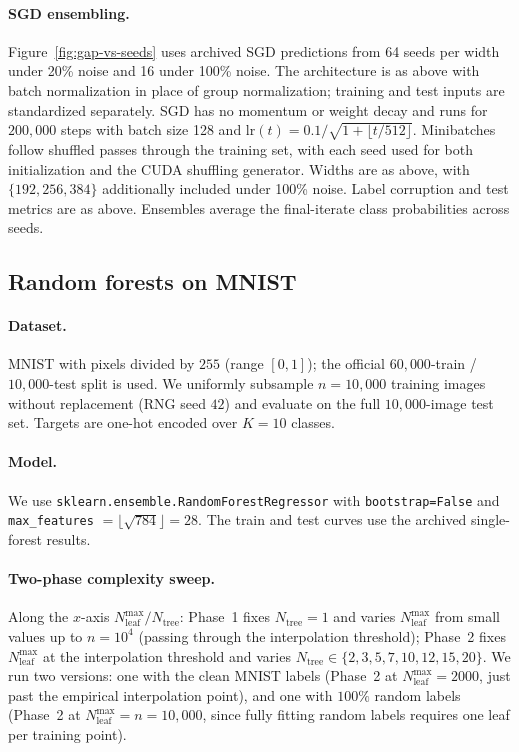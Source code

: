 \paragraph{SGD ensembling.}
Figure~\ref{fig:gap-vs-seeds} uses archived SGD predictions from 64 seeds
per width under 20\% noise and 16 under 100\% noise. The architecture is
as above with batch normalization in place of group normalization;
training and test inputs are standardized separately. SGD has no momentum
or weight decay and runs for $200{,}000$ steps with batch size 128 and
$\mathrm{lr}(t)=0.1/\sqrt{1+\lfloor t/512\rfloor}$.
Minibatches follow shuffled passes through the training set, with each
seed used for both initialization and the CUDA shuffling generator.
Widths are as above, with $\{192,256,384\}$ additionally included under
100\% noise. Label corruption and test metrics are as above. Ensembles
average the final-iterate class probabilities across seeds.

\subsection{Random forests on MNIST}

\paragraph{Dataset.}
MNIST with pixels divided by $255$ (range $[0,1]$); the official
$60{,}000$-train / $10{,}000$-test split is used. We uniformly subsample
$n = 10{,}000$ training images without replacement (RNG seed $42$) and
evaluate on the full $10{,}000$-image test set. Targets are one-hot
encoded over $K = 10$ classes.

\paragraph{Model.}
We use \texttt{sklearn.ensemble.RandomForestRegressor} with
\texttt{bootstrap=False} and \texttt{max\_features} $= \lfloor\sqrt{784}\rfloor = 28$.
The train and test curves use the archived single-forest results.

\paragraph{Two-phase complexity sweep.}
Along the $x$-axis $N^{\mathrm{max}}_{\mathrm{leaf}} / N_{\mathrm{tree}}$:
Phase~1 fixes $N_{\mathrm{tree}} = 1$ and varies
$N^{\mathrm{max}}_{\mathrm{leaf}}$ from small values up to $n=10^4$
(passing through the interpolation threshold); Phase~2 fixes
$N^{\mathrm{max}}_{\mathrm{leaf}}$ at the interpolation threshold and
varies $N_{\mathrm{tree}} \in \{2, 3, 5, 7, 10, 12, 15, 20\}$. We run two
versions: one with the clean MNIST labels (Phase~2 at
$N^{\mathrm{max}}_{\mathrm{leaf}}=2000$, just past the empirical
interpolation point), and one with $100\%$ random labels (Phase~2 at
$N^{\mathrm{max}}_{\mathrm{leaf}}=n=10{,}000$, since fully fitting random
labels requires one leaf per training point).


